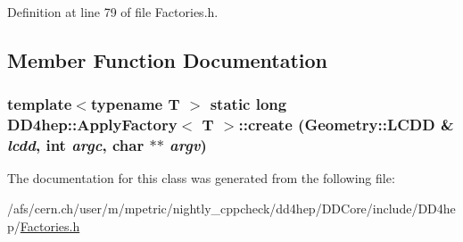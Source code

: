 Definition at line 79 of file Factories.h.

\subsection{Member Function Documentation}
\hypertarget{class_d_d4hep_1_1_apply_factory_abf2c5831e9f7ddafeb30d13373e0ce82}{
\subsubsection[{create}]{\setlength{\rightskip}{0pt plus 5cm}template$<$typename T $>$ static long {\bf DD4hep::ApplyFactory}$<$ {\bf T} $>$::create ({\bf Geometry::LCDD} \& {\em lcdd}, \/  int {\em argc}, \/  char $\ast$$\ast$ {\em argv})}}
\label{class_d_d4hep_1_1_apply_factory_abf2c5831e9f7ddafeb30d13373e0ce82}


The documentation for this class was generated from the following file:\begin{DoxyCompactItemize}
\item 
/afs/cern.ch/user/m/mpetric/nightly\_\-cppcheck/dd4hep/DDCore/include/DD4hep/\hyperlink{_d_d_core_2include_2_d_d4hep_2_factories_8h}{Factories.h}\end{DoxyCompactItemize}
